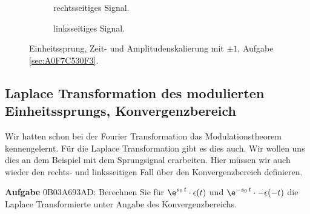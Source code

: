 \begin{figure*}[h!]
\begin{subfigure}{0.45\textwidth}
\caption{rechtsseitiges Signal.}
\end{subfigure}
%
\begin{subfigure}{0.45\textwidth}
\caption{linksseitiges Signal.}
\end{subfigure}
%
%
%
\caption{Einheitssprung, Zeit- und Amplitudenskalierung mit $\pm 1$,
Aufgabe \ref{sec:A0F7C530F3}.}
\label{fig:A0F7C530F3}
\end{figure*}




\clearpage
\subsection{Laplace Transformation des modulierten Einheitssprungs,
Konvergenzbereich}
\label{sec:0B03A693AD}
\begin{Ziel}
Wir hatten schon bei der Fourier Transformation das Modulationstheorem
kennengelernt. Für die Laplace Transformation gibt es dies auch.
Wir wollen uns dies an dem Beispiel mit dem Sprungsignal erarbeiten.
Hier müssen wir auch wieder den rechts- und linksseitigen Fall über den
Konvergenzbereich definieren.
\end{Ziel}
\textbf{Aufgabe} {\tiny 0B03A693AD}: Berechnen Sie für $\e^{s_0 \, t} \cdot \epsilon(t)$
und $\e^{-s_0 \, t} \cdot -\epsilon(-t)$ die Laplace Transformierte unter Angabe
des Konvergenzbereichs.

